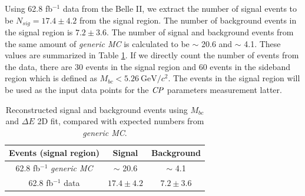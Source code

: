 Using 62.8 fb$^{-1}$ data from the Belle II, we extract the number of signal events to be $N_{sig} = 17.4 \pm 4.2$ from the signal region. The number of background events in the signal region is $7.2\pm 3.6$. The number of signal and background events from the same amount of \textit{generic MC} is calculated to be $\sim$ 20.6 and $\sim$ 4.1.  These values are summarized in Table \ref{tab:recoB}. If we directly count the number of events from the data, there are 30 events in the signal region and 60 events in the sideband region which is defined as $M_{bc} < 5.26 ~ \text{GeV}/c^2$. The events in the signal region will be used as the input data points for the $\it{CP}$ parameters measurement latter. 

 \begin{table}[htpb]
 	\centering 
 	\caption{Reconstructed signal and background events using $M_{bc}$ and $\Delta E$ 2D fit, compared with expected numbers from \textit{generic MC}.}
 	\label{tab:recoB}
 	\begin{tabular}{|c|c|c|} 
 		\hline
 		Events (signal region) & Signal &  Background\\
 		\hline
 		62.8 fb$^{-1}$ \textit{generic MC} & $\sim$ 20.6 & $\sim$ 4.1\\
 		\hline
 	    62.8 fb$^{-1}$ data & $17.4\pm 4.2$ & $7.2\pm 3.6$\\
 		\hline
 	\end{tabular}
 \end{table}
 
